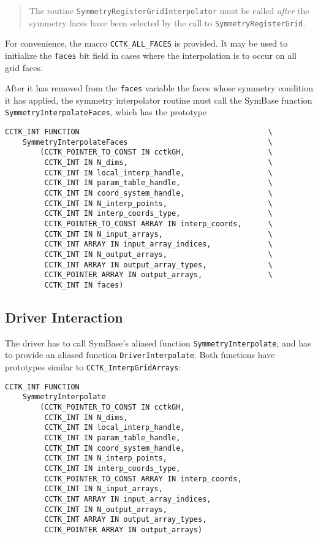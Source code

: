 \begin{quote}
  The routine \texttt{SymmetryRegisterGridInterpolator} must be called
  \emph{after} the symmetry faces have been selected by the call to
  \texttt{SymmetryRegisterGrid}.
\end{quote}

For convenience, the macro \texttt{CCTK\_ALL\_FACES} is provided.
It may be used to initialize the \texttt{faces} bit field in cases
where the interpolation is to occur on all grid faces.

After it has removed from the \texttt{faces} variable the faces whose
symmetry condition it has applied, the symmetry interpolator routine
must call the SymBase function \texttt{SymmetryInterpolateFaces}, which
has the prototype

\begin{verbatim}
CCTK_INT FUNCTION                                           \
    SymmetryInterpolateFaces                                \
        (CCTK_POINTER_TO_CONST IN cctkGH,                   \
         CCTK_INT IN N_dims,                                \
         CCTK_INT IN local_interp_handle,                   \
         CCTK_INT IN param_table_handle,                    \
         CCTK_INT IN coord_system_handle,                   \
         CCTK_INT IN N_interp_points,                       \
         CCTK_INT IN interp_coords_type,                    \
         CCTK_POINTER_TO_CONST ARRAY IN interp_coords,      \
         CCTK_INT IN N_input_arrays,                        \
         CCTK_INT ARRAY IN input_array_indices,             \
         CCTK_INT IN N_output_arrays,                       \
         CCTK_INT ARRAY IN output_array_types,              \
         CCTK_POINTER ARRAY IN output_arrays,               \
         CCTK_INT IN faces)
\end{verbatim}



\subsection{Driver Interaction}
\label{SymBase.driver_interaction}

The driver has to call SymBase's aliased function
\texttt{SymmetryInterpolate}, and has to provide an aliased function
\texttt{DriverInterpolate}.  Both functions have prototypes similar to 
\texttt{CCTK\_InterpGridArrays}:

\begin{verbatim}
CCTK_INT FUNCTION
    SymmetryInterpolate
        (CCTK_POINTER_TO_CONST IN cctkGH,
         CCTK_INT IN N_dims,
         CCTK_INT IN local_interp_handle,
         CCTK_INT IN param_table_handle,
         CCTK_INT IN coord_system_handle,
         CCTK_INT IN N_interp_points,
         CCTK_INT IN interp_coords_type,
         CCTK_POINTER_TO_CONST ARRAY IN interp_coords,
         CCTK_INT IN N_input_arrays,
         CCTK_INT ARRAY IN input_array_indices,
         CCTK_INT IN N_output_arrays,
         CCTK_INT ARRAY IN output_array_types,
         CCTK_POINTER ARRAY IN output_arrays)
\end{verbatim}

